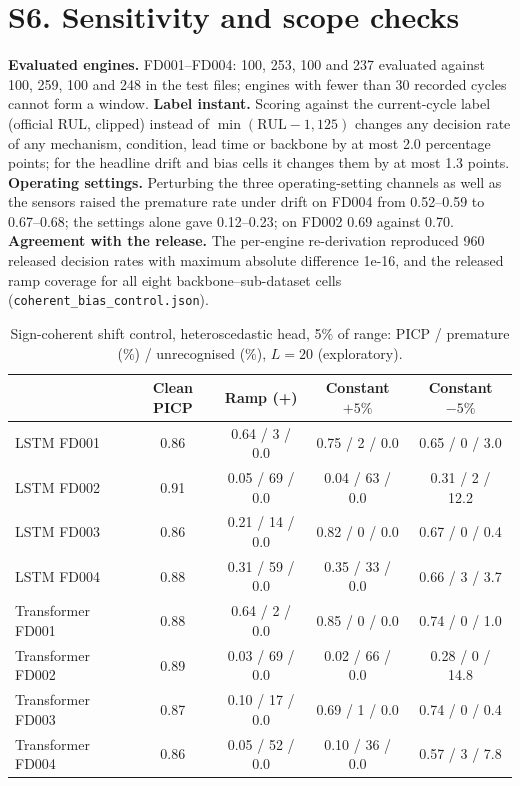 \documentclass[10pt,a4paper]{article}
\newcommand{\NAOneFDtwoSens}{0.69}
\newcommand{\NAOneFDtwoJoint}{0.70}
\newcommand{\NAOneFDfourSens}{0.52--0.59}
\newcommand{\NAOneFDfourJoint}{0.67--0.68}
\newcommand{\NAOneFDfourSet}{0.12--0.23}
\newcommand{\JEvalEng}{100, 253, 100 and 237}
\newcommand{\JFileEng}{100, 259, 100 and 248}
\newcommand{\JAgreeN}{960}
\newcommand{\JAgreeMax}{1e-16}
\newcommand{\JLabelMax}{2.0}
\newcommand{\JLabelHeadline}{1.3}
\begin{document}
\FloatBarrier
\section*{S6. Sensitivity and scope checks}
\noindent\textbf{Evaluated engines.} FD001--FD004: \JEvalEng{} evaluated against \JFileEng{} in the test files; engines with fewer than 30 recorded cycles cannot form a window. \textbf{Label instant.} Scoring against the current-cycle label (official RUL, clipped) instead of $\min(\mathrm{RUL}-1,125)$ changes any decision rate of any mechanism, condition, lead time or backbone by at most \JLabelMax{} percentage points; for the headline drift and bias cells it changes them by at most \JLabelHeadline{} points. \textbf{Operating settings.} Perturbing the three operating-setting channels as well as the sensors raised the premature rate under drift on FD004 from \NAOneFDfourSens{} to \NAOneFDfourJoint; the settings alone gave \NAOneFDfourSet{}; on FD002 \NAOneFDtwoSens{} against \NAOneFDtwoJoint. \textbf{Agreement with the release.} The per-engine re-derivation reproduced \JAgreeN{} released decision rates with maximum absolute difference \JAgreeMax{}, and the released ramp coverage for all eight backbone--sub-dataset cells (\texttt{coherent\_bias\_control.json}).
\begin{table}[H]\centering\scriptsize
\caption{Sign-coherent shift control, heteroscedastic head, 5\% of range: PICP / premature (\%) / unrecognised (\%), $L=20$ (exploratory).}
\begin{tabular}{lcccc}\toprule & Clean PICP & Ramp (+) & Constant $+5\%$ & Constant $-5\%$ \\ \midrule
LSTM FD001 & 0.86 & 0.64 / 3 / 0.0 & 0.75 / 2 / 0.0 & 0.65 / 0 / 3.0 \\
LSTM FD002 & 0.91 & 0.05 / 69 / 0.0 & 0.04 / 63 / 0.0 & 0.31 / 2 / 12.2 \\
LSTM FD003 & 0.86 & 0.21 / 14 / 0.0 & 0.82 / 0 / 0.0 & 0.67 / 0 / 0.4 \\
LSTM FD004 & 0.88 & 0.31 / 59 / 0.0 & 0.35 / 33 / 0.0 & 0.66 / 3 / 3.7 \\
\midrule
Transformer FD001 & 0.88 & 0.64 / 2 / 0.0 & 0.85 / 0 / 0.0 & 0.74 / 0 / 1.0 \\
Transformer FD002 & 0.89 & 0.03 / 69 / 0.0 & 0.02 / 66 / 0.0 & 0.28 / 0 / 14.8 \\
Transformer FD003 & 0.87 & 0.10 / 17 / 0.0 & 0.69 / 1 / 0.0 & 0.74 / 0 / 0.4 \\
Transformer FD004 & 0.86 & 0.05 / 52 / 0.0 & 0.10 / 36 / 0.0 & 0.57 / 3 / 7.8 \\
\bottomrule\end{tabular}
\end{table}
\end{document}

